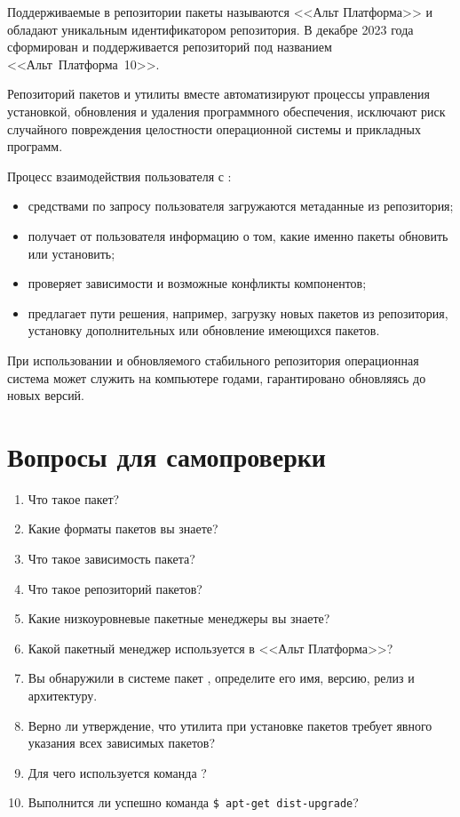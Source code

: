 Поддерживаемые в  репозитории пакеты называются <<Альт Платформа>> и обладают уникальным идентификатором
репозитория. В декабре 2023 года сформирован и поддерживается репозиторий  под названием <<Альт~Платформа~10>>.

Репозиторий пакетов и утилиты  вместе автоматизируют процессы управления установкой, обновления и удаления
программного обеспечения, исключают риск случайного повреждения целостности операционной системы и прикладных
программ.

Процесс взаимодействия пользователя с :
\begin{itemize}
	\item средствами  по запросу пользователя загружаются метаданные из репозитория;
	\item {} получает от пользователя информацию о том, какие именно пакеты обновить или установить;
	\item {} проверяет зависимости и возможные конфликты компонентов;
	\item {} предлагает пути решения, например, загрузку новых пакетов из репозитория, установку дополнительных или обновление имеющихся пакетов.
\end{itemize}


При использовании  и обновляемого стабильного репозитория операционная система может
служить на компьютере годами, гарантировано обновляясь до новых версий.

\section{Вопросы для самопроверки}

\begin{enumerate}
	\item Что такое пакет?
	\item Какие форматы пакетов вы знаете?
	\item Что такое зависимость пакета?
	\item Что такое репозиторий пакетов?
	\item Какие низкоуровневые пакетные менеджеры вы знаете?
	\item Какой пакетный менеджер используется в <<Альт Платформа>>?
	\item Вы обнаружили в системе пакет , определите его имя, версию, релиз и архитектуру.
	\item Верно ли утверждение, что утилита  при установке пакетов требует явного указания всех зависимых пакетов?
	\item Для чего используется команда ?
	\item Выполнится ли успешно команда \verb!$ apt-get dist-upgrade!?
\end{enumerate}
